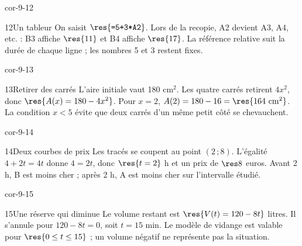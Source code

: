 \begin{blocLivre}{cor-9-12}\begin{corrige}{12}{Un tableur}
On saisit $\res{\texttt{=5+3*A2}}$. Lors de la recopie, A2 devient A3, A4, etc. : B3 affiche $\res{11}$ et B4 affiche $\res{17}$. La référence relative suit la durée de chaque ligne ; les nombres 5 et 3 restent fixes.
\label{fig-cor-9-12}
\end{corrige}\end{blocLivre}
\begin{blocLivre}{cor-9-13}\begin{corrige}{13}{Retirer des carrés}
L’aire initiale vaut 180 cm$^2$. Les quatre carrés retirent $4x^2$, donc $\res{A(x)=180-4x^2}$. Pour $x=2$, $A(2)=180-16=\res{164\ \mathrm{cm}^2}$. La condition $x<5$ évite que deux carrés d’un même petit côté se chevauchent.
\label{fig-cor-9-13}
\end{corrige}\end{blocLivre}
\begin{blocLivre}{cor-9-14}\begin{corrige}{14}{Deux courbes de prix}
Les tracés se coupent au point $(2\,;8)$. L’égalité $4+2t=4t$ donne $4=2t$, donc $\res{t=2}$ h et un prix de $\res8$ euros. Avant 2 h, B est moins cher ; après 2 h, A est moins cher sur l’intervalle étudié.
\label{fig-cor-9-14}
\end{corrige}\end{blocLivre}
\begin{blocLivre}{cor-9-15}\begin{corrige}{15}{Une réserve qui diminue}
Le volume restant est $\res{V(t)=120-8t}$ litres. Il s’annule pour $120-8t=0$, soit $t=15$ min. Le modèle de vidange est valable pour $\res{0\le t\le15}$ ; un volume négatif ne représente pas la situation.
\label{fig-cor-9-15}
\end{corrige}\end{blocLivre}
